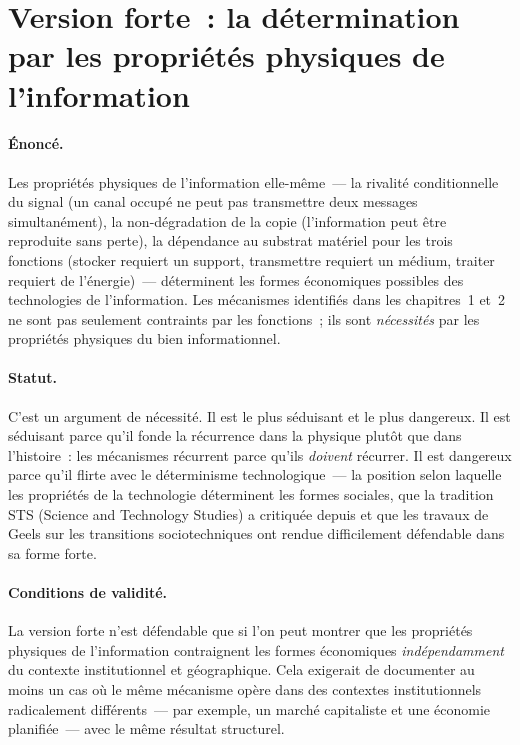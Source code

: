 \section{Version forte~: la détermination par les propriétés physiques de l'information}

\paragraph{Énoncé.} Les propriétés physiques de l'information elle-même~--- la rivalité conditionnelle du signal (un canal occupé ne peut pas transmettre deux messages simultanément), la non-dégradation de la copie (l'information peut être reproduite sans perte), la dépendance au substrat matériel pour les trois fonctions (stocker requiert un support, transmettre requiert un médium, traiter requiert de l'énergie)~--- déterminent les formes économiques possibles des technologies de l'information. Les mécanismes identifiés dans les chapitres~1 et~2 ne sont pas seulement contraints par les fonctions~; ils sont \emph{nécessités} par les propriétés physiques du bien informationnel.

\paragraph{Statut.} C'est un argument de nécessité. Il est le plus séduisant et le plus dangereux. Il est séduisant parce qu'il fonde la récurrence dans la physique plutôt que dans l'histoire~: les mécanismes récurrent parce qu'ils \emph{doivent} récurrer. Il est dangereux parce qu'il flirte avec le déterminisme technologique~--- la position selon laquelle les propriétés de la technologie déterminent les formes sociales, que la tradition STS (Science and Technology Studies) a critiquée depuis \textcite{hughes_networks_1983} et que les travaux de Geels sur les transitions sociotechniques ont rendue difficilement défendable dans sa forme forte.

\paragraph{Conditions de validité.} La version forte n'est défendable que si l'on peut montrer que les propriétés physiques de l'information contraignent les formes économiques \emph{indépendamment} du contexte institutionnel et géographique. Cela exigerait de documenter au moins un cas où le même mécanisme opère dans des contextes institutionnels radicalement différents~--- par exemple, un marché capitaliste et une économie planifiée~--- avec le même résultat structurel.

